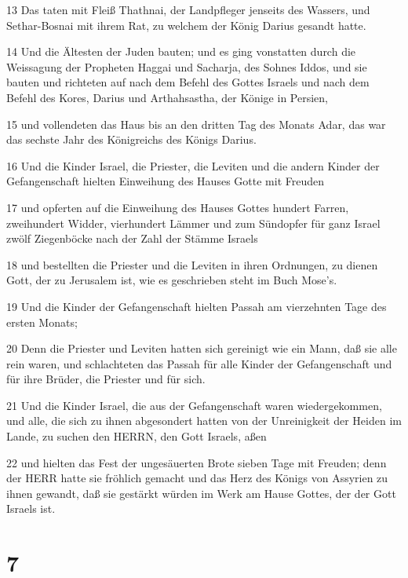 \par 13 Das taten mit Fleiß Thathnai, der Landpfleger jenseits des Wassers, und Sethar-Bosnai mit ihrem Rat, zu welchem der König Darius gesandt hatte.
\par 14 Und die Ältesten der Juden bauten; und es ging vonstatten durch die Weissagung der Propheten Haggai und Sacharja, des Sohnes Iddos, und sie bauten und richteten auf nach dem Befehl des Gottes Israels und nach dem Befehl des Kores, Darius und Arthahsastha, der Könige in Persien,
\par 15 und vollendeten das Haus bis an den dritten Tag des Monats Adar, das war das sechste Jahr des Königreichs des Königs Darius.
\par 16 Und die Kinder Israel, die Priester, die Leviten und die andern Kinder der Gefangenschaft hielten Einweihung des Hauses Gotte mit Freuden
\par 17 und opferten auf die Einweihung des Hauses Gottes hundert Farren, zweihundert Widder, vierhundert Lämmer und zum Sündopfer für ganz Israel zwölf Ziegenböcke nach der Zahl der Stämme Israels
\par 18 und bestellten die Priester und die Leviten in ihren Ordnungen, zu dienen Gott, der zu Jerusalem ist, wie es geschrieben steht im Buch Mose's.
\par 19 Und die Kinder der Gefangenschaft hielten Passah am vierzehnten Tage des ersten Monats;
\par 20 Denn die Priester und Leviten hatten sich gereinigt wie ein Mann, daß sie alle rein waren, und schlachteten das Passah für alle Kinder der Gefangenschaft und für ihre Brüder, die Priester und für sich.
\par 21 Und die Kinder Israel, die aus der Gefangenschaft waren wiedergekommen, und alle, die sich zu ihnen abgesondert hatten von der Unreinigkeit der Heiden im Lande, zu suchen den HERRN, den Gott Israels, aßen
\par 22 und hielten das Fest der ungesäuerten Brote sieben Tage mit Freuden; denn der HERR hatte sie fröhlich gemacht und das Herz des Königs von Assyrien zu ihnen gewandt, daß sie gestärkt würden im Werk am Hause Gottes, der der Gott Israels ist.

\chapter{7}

